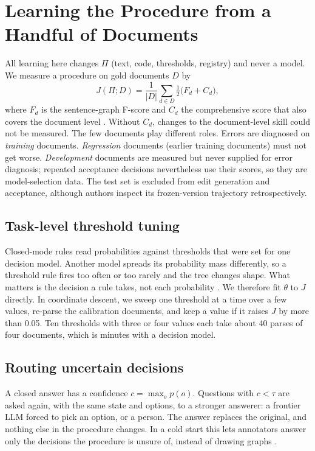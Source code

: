 \section{Learning the Procedure from a Handful of Documents}
\label{sec:learning}

All learning here changes $\Pi$ (text, code, thresholds, registry) and never a model. We measure a procedure on gold documents $D$ by
\begin{equation}
J(\Pi; D) = \frac{1}{|D|}\sum_{d \in D} \tfrac{1}{2}\bigl(F_d + C_d\bigr),
\label{eq:objective}
\end{equation}
where $F_d$ is the sentence-graph F-score and $C_d$ the comprehensive score that also covers the document level \citep{sun2024ancast}. Without $C_d$, changes to the document-level skill could not be measured. The few documents play different roles. Errors are diagnosed on \emph{training} documents. \emph{Regression} documents (earlier training documents) must not get worse. \emph{Development} documents are measured but never supplied for error diagnosis; repeated acceptance decisions nevertheless use their scores, so they are model-selection data. The test set is excluded from edit generation and acceptance, although authors inspect its frozen-version trajectory retrospectively.

\subsection{Task-level threshold tuning}
\label{sec:calibration}
Closed-mode rules read probabilities against thresholds that were set for one decision model. Another model spreads its probability mass differently, so a threshold rule fires too often or too rarely and the tree changes shape. What matters is the decision a rule takes, not each probability \citep[cf.][]{zhao2021calibrate}. We therefore fit $\theta$ to $J$ directly. In coordinate descent, we sweep one threshold at a time over a few values, re-parse the calibration documents, and keep a value if it raises $J$ by more than 0.05. Ten thresholds with three or four values each take about 40 parses of four documents, which is minutes with a decision model.

\subsection{Routing uncertain decisions}
\label{sec:routing}
A closed answer has a confidence $c=\max_o p(o)$. Questions with $c<\tau$ are asked again, with the same state and options, to a stronger answerer: a frontier LLM forced to pick an option, or a person. The answer replaces the original, and nothing else in the procedure changes. In a cold start this lets annotators answer only the decisions the procedure is unsure of, instead of drawing graphs .


